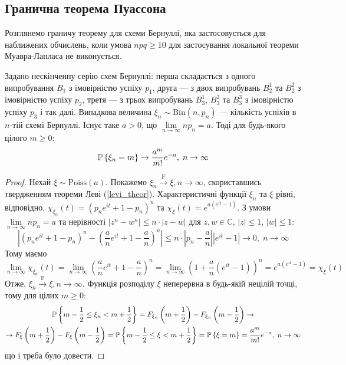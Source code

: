 \subsection{Гранична теорема Пуассона}
Розглянемо граничу теорему для схеми Бернуллі, яка застосовується для наближених обчислень, коли умова $npq \geq 10$ 
для застосування локальної теореми Муавра-Лапласа не виконується.
\begin{theorem*}
    Задано нескінченну серію схем Бернуллі: перша складається з одного випробування $B_1$ з імовірністю успіху $p_1$, 
    друга --- з двох випробувань $B_2^1$ та $B_2^2$ з імовірністю успіху $p_2$, 
    третя --- з трьох випробувань $B_3^1$, $B_3^2$ та $B_3^3$ з імовірністю успіху $p_3$ і так далі.
    Випадкова величина $\xi_n \sim \mathrm{Bin}(n, p_n)$ --- кількість успіхів в $n$-тій схемі Бернуллі.
    Існує таке $a > 0$, що $\underset{n\to\infty}{\lim} n p_n = a$.
    Тоді для будь-якого цілого $m \geq 0$:
    \begin{gather}
        \P\left\{\xi_n = m\right\} \to \frac{a^m}{m!} e^{-a}, \; n\to \infty
    \end{gather}
\end{theorem*}
\begin{proof}
    Нехай $\xi \sim \mathrm{Poiss}(a)$. Покажемо $\xi_n \overset{\mathrm{F}}{\longrightarrow} \xi, n\to\infty$, скориставшись твердженням теореми Леві (\ref{levi_theor}).
    Характеристичні функції $\xi_n$ та $\xi$ рівні, відповідно, $\chi_{\xi_n}(t) = \left(p_n e^{it} + 1 - p_n \right)^n$ та $\chi_{\xi}(t) = e^{a\left( e^{it} - 1\right)}$.
    З умови $\underset{n\to\infty}{\lim} n p_n = a$ та нерівності $\left| z^n - w^n\right| \leq n\cdot\left| z - w\right|$ для $z, w \in \mathbb{C}$, $|z|\leq1$, $|w|\leq1$:
    $$
    \left| \left(p_n e^{it} + 1 - p_n \right)^n - \left(\frac{a}{n} e^{it} + 1 - \frac{a}{n} \right)^n\right| \leq
    n \cdot \left| p_n - \frac{a}{n}\right| \left| e^{it} - 1\right| \to 0, \; n\to\infty
    $$
    Тому маємо
    $$
    \underset{n\to\infty}{\lim} \chi_{\xi_n}(t) = \underset{n\to\infty}{\lim} \left(\frac{a}{n} e^{it} + 1 - \frac{a}{n} \right)^n = 
    \underset{n\to\infty}{\lim} \left(1 + \frac{a}{n} \left(e^{it} - 1\right) \right)^n = e^{a\left( e^{it} - 1\right)} = \chi_{\xi}(t)
    $$
    Отже, $\xi_n \overset{\mathrm{F}}{\longrightarrow} \xi, n\to\infty$. Функція розподілу $\xi$ неперервна в будь-якій нецілій точці, тому для цілих $m \geq 0$:
    \begin{gather*}
        \P\left\{ m - \frac{1}{2} \leq \xi_n < m + \frac{1}{2}\right\} = F_{\xi_n}\left( m + \frac{1}{2}\right) -
        F_{\xi_n}\left( m - \frac{1}{2}\right) \to \\ \to F_{\xi}\left( m + \frac{1}{2}\right) -
        F_{\xi}\left( m - \frac{1}{2}\right) = \P\left\{ m - \frac{1}{2} \leq \xi < m + \frac{1}{2}\right\} =
        \P\left\{ \xi = m\right\} = \frac{a^m}{m!} e^{-a}, \; n\to \infty
    \end{gather*}
    що і треба було довести.
\end{proof}
